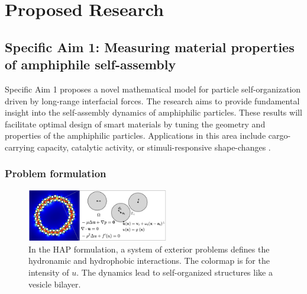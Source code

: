 \section{Proposed Research}
\label{sec:proposed-work}

\subsection{Specific Aim 1: Measuring material properties of amphiphile
  self-assembly}
\label{subsec:specific_aim_1}
Specific Aim 1 proposes a novel mathematical model for particle
self-organization driven by long-range interfacial forces. 
The research aims to provide fundamental insight into the
self-assembly dynamics of amphiphilic particles. These results will
facilitate optimal design of smart materials by tuning the geometry and
properties of the amphiphilic particles.
Applications in this area include cargo-carrying capacity, 
catalytic activity, or stimuli-responsive shape-changes
\cite{McBr21, HaBr20}.

\subsubsection{Problem formulation}
\begin{figure}
 \centering
 \vspace{-3pt}
 \includegraphics[width=0.55\textwidth]{figures/Domain.jpg}
 \caption{\label{fig:flow_map}
   In the HAP formulation,
   a system of exterior problems 
   defines the hydronamic and hydrophobic interactions.
   The colormap is for the intensity of $u$.
   The dynamics lead to self-organized structures like a vesicle bilayer.}
\end{figure}

